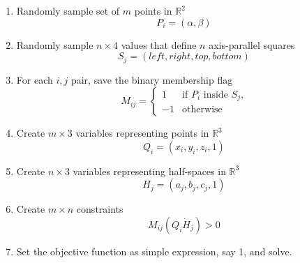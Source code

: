 \documentclass{NSF}
\begin{document}
\begin{enumerate}
\item Randomly sample set of $m$ points in $\mathbb{R}^2$ \begin{equation*}
				P_i = (\alpha, \beta)
\end{equation*}
\item Randomly sample $n \times 4$ values that define $n$ axis-parallel squares \begin{equation*}
				S_j=(left,right,top,bottom)
			\end{equation*}
\item For each $i,j$ pair, save the binary membership flag \begin{equation*}
M_{ij} =\begin{cases}
            	1 & \text{if $P_i$ inside $S_j$,} \\
                -1 & \text{otherwise}
            \end{cases}
\end{equation*}
\item Create $m \times 3$ variables representing points in $\mathbb{R}^3 $ \begin{equation*}
			Q_i = (x_i,y_i,z_i, 1)
\end{equation*}
\item Create $n \times 3$ variables representing half-spaces in $\mathbb{R}^3 $ \begin{equation*}
				H_j = (a_j,b_j,c_j, 1)
\end{equation*}
\item Create $m \times n$ constraints \begin{equation*}
			M_{ij}(Q_i \dot H_j) > 0
\end{equation*}
\item Set the objective function as simple expression, say 1, and solve.

\end{enumerate}
\end{document}
